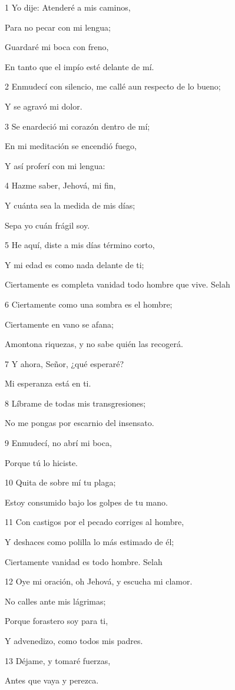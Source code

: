 \par 1 Yo dije: Atenderé a mis caminos,
\par Para no pecar con mi lengua;
\par Guardaré mi boca con freno,
\par En tanto que el impío esté delante de mí.
\par 2 Enmudecí con silencio, me callé aun respecto de lo bueno;
\par Y se agravó mi dolor.
\par 3 Se enardeció mi corazón dentro de mí;
\par En mi meditación se encendió fuego,
\par Y así proferí con mi lengua:
\par 4 Hazme saber, Jehová, mi fin,
\par Y cuánta sea la medida de mis días;
\par Sepa yo cuán frágil soy.
\par 5 He aquí, diste a mis días término corto,
\par Y mi edad es como nada delante de ti;
\par Ciertamente es completa vanidad todo hombre que vive. Selah
\par 6 Ciertamente como una sombra es el hombre;
\par Ciertamente en vano se afana;
\par Amontona riquezas, y no sabe quién las recogerá.
\par 7 Y ahora, Señor, ¿qué esperaré?
\par Mi esperanza está en ti.
\par 8 Líbrame de todas mis transgresiones;
\par No me pongas por escarnio del insensato.
\par 9 Enmudecí, no abrí mi boca,
\par Porque tú lo hiciste.
\par 10 Quita de sobre mí tu plaga;
\par Estoy consumido bajo los golpes de tu mano.
\par 11 Con castigos por el pecado corriges al hombre,
\par Y deshaces como polilla lo más estimado de él;
\par Ciertamente vanidad es todo hombre. Selah
\par 12 Oye mi oración, oh Jehová, y escucha mi clamor.
\par No calles ante mis lágrimas;
\par Porque forastero soy para ti,
\par Y advenedizo, como todos mis padres.
\par 13 Déjame, y tomaré fuerzas,
\par Antes que vaya y perezca.


